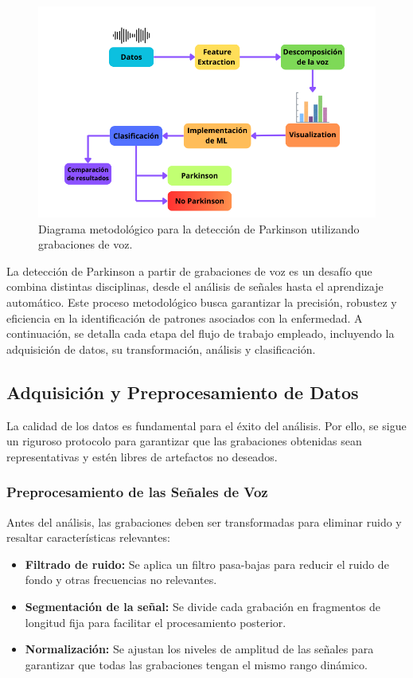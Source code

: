 \documentclass[listof=nochaptergap,12pt,times,authoryear]{report}
\begin{document}
\begin{figure}[H]
    \centering
    \includegraphics[width=\textwidth]{Datos.png}
    \caption{Diagrama metodológico para la detección de Parkinson utilizando grabaciones de voz.}
    \label{fig:diagrama_metodologico}
\end{figure}


La detección de Parkinson a partir de grabaciones de voz es un desafío que combina distintas disciplinas, desde el análisis de señales hasta el aprendizaje automático. Este proceso metodológico busca garantizar la precisión, robustez y eficiencia en la identificación de patrones asociados con la enfermedad. A continuación, se detalla cada etapa del flujo de trabajo empleado, incluyendo la adquisición de datos, su transformación, análisis y clasificación.

\subsection{Adquisición y Preprocesamiento de Datos}
La calidad de los datos es fundamental para el éxito del análisis. Por ello, se sigue un riguroso protocolo para garantizar que las grabaciones obtenidas sean representativas y estén libres de artefactos no deseados.



\subsubsection{Preprocesamiento de las Señales de Voz}
Antes del análisis, las grabaciones deben ser transformadas para eliminar ruido y resaltar características relevantes:
\begin{itemize}
    \item \textbf{Filtrado de ruido:} Se aplica un filtro pasa-bajas para reducir el ruido de fondo y otras frecuencias no relevantes.
    \item \textbf{Segmentación de la señal:} Se divide cada grabación en fragmentos de longitud fija para facilitar el procesamiento posterior.
    \item \textbf{Normalización:} Se ajustan los niveles de amplitud de las señales para garantizar que todas las grabaciones tengan el mismo rango dinámico.
\end{itemize}
\end{document}
